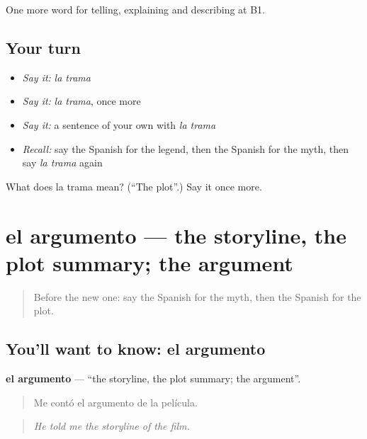\begin{grammarlens}[title={What you've built}]
One more word for telling, explaining and describing at B1.
\end{grammarlens}

\subsection*{Your turn}
\begin{itemize}
\raggedright
  \item \emph{Say it:} \emph{la trama}
  \item \emph{Say it:} \emph{la trama}, once more
  \item \emph{Say it:} a sentence of your own with \emph{la trama}
  \item \emph{Recall:} say the Spanish for the legend, then the Spanish for the myth, then say \emph{la trama} again
\end{itemize}

\begin{tcolorbox}[breakable,colback=teal!4,colframe=teal!35!black,title={Before you move on}]
What does la trama mean? (\textquotedblleft{}The plot\textquotedblright{}.) Say it once more.
\end{tcolorbox}
\section[el argumento]{el argumento — the storyline, the plot summary; the argument}

\label{lesson:ES-C565-argumento}



\begin{quote}
Before the new one: say the Spanish for the myth, then the Spanish for the plot.
\end{quote}

\subsection*{You'll want to know: el argumento}
\textbf{el argumento} — \textquotedblleft{}the storyline, the plot summary; the argument\textquotedblright{}.

\begin{quote}
Me contó el argumento de la película.
\end{quote}

\begin{quote}
\emph{He told me the storyline of the film.}
\end{quote}

